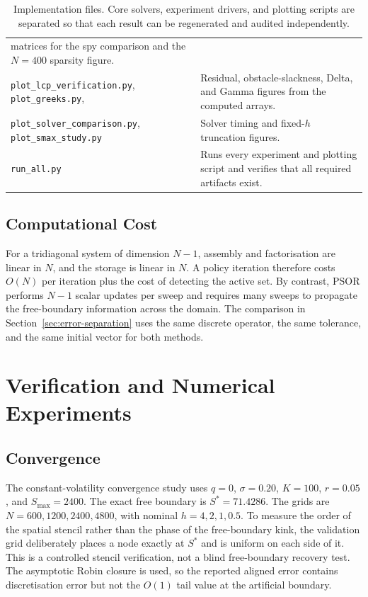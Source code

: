 \documentclass[11pt,a4paper]{article}
\theoremstyle{definition}
\theoremstyle{remark}
\begin{document}
\begin{table}[H]
\begin{tabular}{@{}>{\raggedright\arraybackslash}p{}>{\raggedright\arraybackslash}p{}@{}}
matrices for the spy comparison and the $N=400$ sparsity figure. \\
\texttt{plot\_lcp\_verification.py}, \texttt{plot\_greeks.py}, & Residual,
obstacle-slackness, Delta, and Gamma figures from the computed arrays. \\
\texttt{plot\_solver\_comparison.py}, \texttt{plot\_smax\_study.py} & Solver
timing and fixed-$h$ truncation figures. \\
\texttt{run\_all.py} & Runs every experiment and plotting script and verifies
that all required artifacts exist. \\
\bottomrule
\end{tabular}
\vspace{0.2cm}
\caption{Implementation files. Core solvers, experiment drivers, and
plotting scripts are separated so that each result can be regenerated and
audited independently.}
\label{tab:code_structure}
\end{table}

\subsection{Computational Cost}
For a tridiagonal system of dimension $N-1$, assembly and factorisation are
linear in $N$, and the storage is linear in $N$. A policy iteration therefore
costs $O(N)$ per iteration plus the cost of detecting the active set. By
contrast, PSOR performs $N-1$ scalar updates per sweep and requires many
sweeps to propagate the free-boundary information across the domain. The
comparison in Section~\ref{sec:error-separation} uses the same discrete
operator, the same tolerance, and the same initial vector for both methods.

\newpage
\section{Verification and Numerical Experiments}
\label{sec:experiments}

\subsection{Convergence}
\label{sec:convergence}
The constant-volatility convergence study uses $q=0$, $\sigma=0.20$,
$K=100$, $r=0.05$, and $S_{\max}=2400$. The exact free boundary is
$S^*=71.4286$. The grids are $N=600,1200,2400,4800$, with nominal
$h=4,2,1,0.5$. To measure the order of the spatial stencil rather than the
phase of the free-boundary kink, the validation grid deliberately places a
node exactly at $S^*$ and is uniform on each side of it. This is a controlled
stencil verification, not a blind free-boundary recovery test. The asymptotic
Robin closure is used, so the reported aligned error contains discretisation
error but not the $O(1)$ tail value at the artificial boundary.
\end{document}
